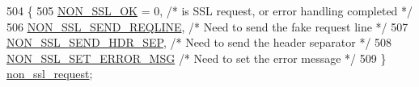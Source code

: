 \begin{DoxyCode}
504          \{
505         \hyperlink{structSSLConnRec_a15459fb4bdcae2344e789314be9d2ffda11b1b56b93188a71fd7d85002ca113e8}{NON\_SSL\_OK} = 0,        \textcolor{comment}{/* is SSL request, or error handling completed */}
506         \hyperlink{structSSLConnRec_a15459fb4bdcae2344e789314be9d2ffdac4763835f3ef448f5c981917f98e6ba9}{NON\_SSL\_SEND\_REQLINE},  \textcolor{comment}{/* Need to send the fake request line */}
507         \hyperlink{structSSLConnRec_a15459fb4bdcae2344e789314be9d2ffdae8c471adea8d0d6e4a64b57c5f98d0e5}{NON\_SSL\_SEND\_HDR\_SEP},  \textcolor{comment}{/* Need to send the header separator */}
508         \hyperlink{structSSLConnRec_a15459fb4bdcae2344e789314be9d2ffdad64c96c19f782f4d30f93059788fb1b2}{NON\_SSL\_SET\_ERROR\_MSG}  \textcolor{comment}{/* Need to set the error message */}
509     \} \hyperlink{structSSLConnRec_ad8e5a6eab97a14984224072bdcaeb49b}{non\_ssl\_request};
\end{DoxyCode}
